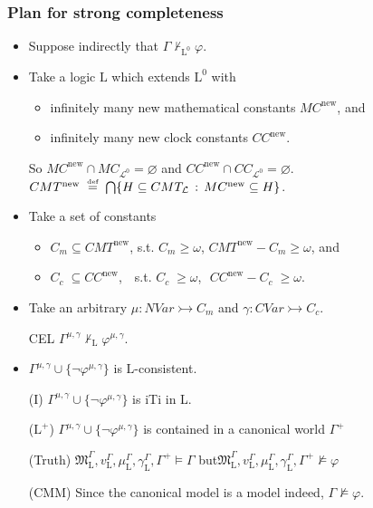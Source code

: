\documentclass[xcolor=x11names]{beamer}
\newcommand{\bemph}[1] {{\color{DeepSkyBlue3}{#1}}}
\newcommand{\defegy}[1][.1]{\hspace{#1cm}\overset{\textup{\tiny def}}{=}\hspace{#1cm}}
\newcommand{\derives}[1][]{\vdash_{\mathrm{#1}}}
\begin{document}
\begin{frame}
\frametitle{Plan for strong completeness}
\footnotesize

\begin{itemize}
\item Suppose indirectly that $\Gamma \not \derives[L^0]\varphi$.
\item Take a logic $\mathrm L$ which extends $\mathrm{L}^0$ with
\begin{itemize}
\item infinitely many new mathematical constants $MC^{\mathrm{new}}$, and
\item infinitely many new clock constants $CC^{\mathrm{new}}$.
\end{itemize}
So $MC^{\mathrm{new}}\cap MC_{\mathcal L^0}=\varnothing$ and $CC^{\mathrm{new}}\cap CC_{\mathcal L^0}=\varnothing$.
\\ $CMT^{\mathrm{new}} \defegy \bigcap \{ H\subseteq CMT_{\mathcal L} \, : \, MC^{\mathrm{new}}\subseteq H  \}$.
\item Take a set of constants
\begin{itemize}
\item $C_m\subseteq CMT^{\mathrm{new}}$, s.t. $C_m \geq \omega$, $CMT^{\mathrm{new}}-C_m\geq \omega$, and
\item $C_c\;\subseteq CC^{\mathrm{new}}$, \;\,\, s.t. $C_c \;\geq \omega$, \;\;\,\,$CC^{\mathrm{new}}-C_c\;\geq \omega$.
\end{itemize}
\item Take an arbitrary  $\mu:NVar \rightarrowtail C_m$  and $\gamma:CVar \rightarrowtail C_c$.
\item[CEL] %
$\Gamma^{\mu, \gamma} \not \derives[L]\varphi^{\mu, \gamma}$.
\item $\Gamma^{\mu, \gamma} \cup\{\lnot\varphi^{\mu, \gamma}\}$ is $\mathrm{L}$-consistent.
\item[(I)]
$\Gamma^{\mu, \gamma} \cup\{\lnot\varphi^{\mu, \gamma}\}$ is iTi in L.
\item[($\mathrm{L}^+$)] $\Gamma^{\mu, \gamma} \cup\{\lnot\varphi^{\mu, \gamma}\}$ is contained in a canonical world $\Gamma^+$
\item[(Truth)] $\mathfrak M_{\mathrm L}^\Gamma, v_{\mathrm L}^\Gamma, \mu_{\mathrm L}^\Gamma, \gamma_{\mathrm L}^\Gamma, \Gamma^+ \models \Gamma$ \quad but\quad  $\mathfrak M_{\mathrm L}^\Gamma, v_{\mathrm L}^\Gamma, \mu_{\mathrm L}^\Gamma, \gamma_{\mathrm L}^\Gamma, \Gamma^+ \not\models \varphi$
\item[(CMM)] Since the canonical model is a model indeed, $\Gamma \not\models \varphi$.
\end{itemize}
\end{frame}
\end{document}

